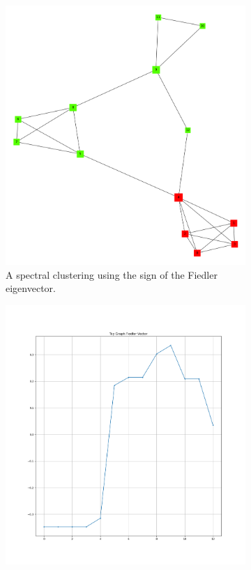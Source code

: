 \documentclass[a4paper,10pt]{article}
\theoremstyle{definition}
\theoremstyle{remark}
\theoremstyle{plain}
\begin{document}
\begin{figure}
\begin{framed}
\centering
\begin{subfigure}[b]{0.5\textwidth}
\includegraphics[width=\textwidth]{example_spectralT2clustering.png}
\caption{A spectral clustering using the sign of the Fiedler eigenvector.}
\label{fig:toygraphspectralclustering}
\end{subfigure}
\begin{subfigure}[b]{0.5\textwidth}
\includegraphics[width=\textwidth]{Toygraph_Fiedler.png}

\end{subfigure}
\end{framed}
\end{figure}
\end{document}
